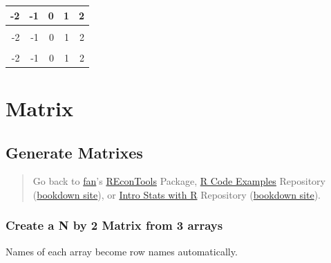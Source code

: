 \documentclass[
]{book}
\begin{document}
\begin{table}[!h]
\centering
\begin{tabular}{r|r|r|r|r}
\hline
-2 & -1 & 0 & 1 & \vphantom{4} 2\\
\hline
\cellcolor{gray!6}{-2} & \cellcolor{gray!6}{-1} & \cellcolor{gray!6}{0} & \cellcolor{gray!6}{1} & \cellcolor{gray!6}{\vphantom{3} 2}\\
\hline
-2 & -1 & 0 & 1 & \vphantom{2} 2\\
\hline
\cellcolor{gray!6}{-2} & \cellcolor{gray!6}{-1} & \cellcolor{gray!6}{0} & \cellcolor{gray!6}{1} & \cellcolor{gray!6}{\vphantom{1} 2}\\
\hline
-2 & -1 & 0 & 1 & 2\\
\hline
\end{tabular}
\end{table}

\hypertarget{matrix}{%
\section{Matrix}\label{matrix}}

\hypertarget{generate-matrixes}{%
\subsection{Generate Matrixes}\label{generate-matrixes}}

\begin{quote}
Go back to \href{http://fanwangecon.github.io/}{fan}'s \href{https://fanwangecon.github.io/REconTools/}{REconTools} Package, \href{https://fanwangecon.github.io/R4Econ/}{R Code Examples} Repository (\href{https://fanwangecon.github.io/R4Econ/bookdown}{bookdown site}), or \href{https://fanwangecon.github.io/Stat4Econ/}{Intro Stats with R} Repository (\href{https://fanwangecon.github.io/Stat4Econ/bookdown}{bookdown site}).
\end{quote}

\hypertarget{create-a-n-by-2-matrix-from-3-arrays}{%
\subsubsection{Create a N by 2 Matrix from 3 arrays}\label{create-a-n-by-2-matrix-from-3-arrays}}

Names of each array become row names automatically.
\end{document}
